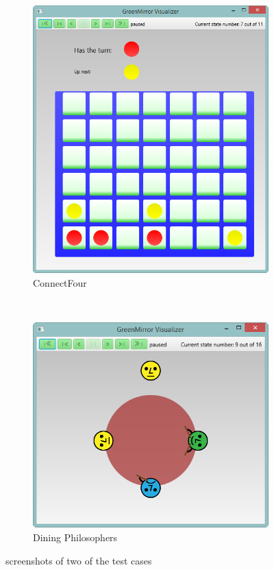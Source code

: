 \begin{figure}[h]
\centering
    \begin{subfigure}[b]{0.53\textwidth}
    \includegraphics[width=\textwidth]{images/connectfour}
    \caption{ConnectFour}\label{fig:connectfour}
    \end{subfigure}
    ~
    \begin{subfigure}[b]{0.44\textwidth}
    \includegraphics[width=\textwidth]{images/phil}
    \caption{Dining Philosophers}\label{fig:phil}
    \end{subfigure}
\caption{screenshots of two of the test cases}\label{fig:connectfour_phil}
\end{figure}
